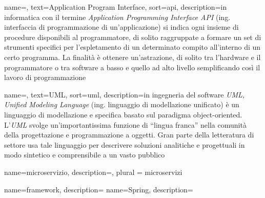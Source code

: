 
\renewcommand{\acronymname}{Acronimi e abbreviazioni}





{
    name=,
    text=Application Program Interface,
    sort=api,
    description={in informatica con il termine \emph{Application Programming Interface API} (ing. interfaccia di programmazione di un'applicazione) si indica ogni insieme di procedure disponibili al programmatore, di solito raggruppate a formare un set di strumenti specifici per l'espletamento di un determinato compito all'interno di un certo programma. La finalità è ottenere un'astrazione, di solito tra l'hardware e il programmatore o tra software a basso e quello ad alto livello semplificando così il lavoro di programmazione}
}

{
    name=,
    text=UML,
    sort=uml,
    description={in ingegneria del software \emph{UML, Unified Modeling Language} (ing. linguaggio di modellazione unificato) è un linguaggio di modellazione e specifica basato sul paradigma object-oriented. L'\emph{UML} svolge un'importantissima funzione di ``lingua franca'' nella comunità della progettazione e programmazione a oggetti. Gran parte della letteratura di settore usa tale linguaggio per descrivere soluzioni analitiche e progettuali in modo sintetico e comprensibile a un vasto pubblico}
}

{
    name={microservizio},
    description={},
    plural = {microservizi}
}

{
    name={framework},
    description={}
}
{
    name={Spring},
    description={}
}

